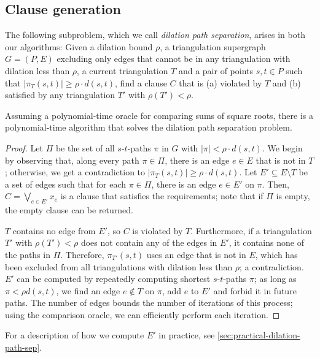 \subsection{Clause generation}
The following subproblem, which we call \emph{dilation path separation}, arises in both our algorithms:
Given a dilation bound $\rho$, a triangulation supergraph $G = (P, E)$ excluding only edges that cannot be in any triangulation with dilation less than $\rho$,
a current triangulation $T$ and a pair of points $s,t \in P$ such that $|\pi_T(s,t)| \geq \rho \cdot d(s,t)$, 
find a clause $C$ that is (a) violated by $T$ and (b) satisfied by any triangulation $T'$ with $\rho(T') < \rho$.

\begin{lemma}
    Assuming a polynomial-time oracle for comparing sums of square roots,
    there is a polynomial-time algorithm that solves the dilation path separation problem.
\end{lemma}
\begin{proof}
    Let $\Pi$ be the set of all $s$-$t$-paths $\pi$ in $G$ with $|\pi| < \rho \cdot d(s,t)$.
    We begin by observing that, along every path $\pi \in \Pi$, there is an edge $e \in E$
    that is not in $T$; otherwise, we get a contradiction to $|\pi_T(s,t)| \geq \rho \cdot d(s,t)$.
    Let $E' \subseteq E \setminus T$ be a set of edges such that for each $\pi \in \Pi$, 
    there is an edge $e \in E'$ on $\pi$.
    Then, $C = \bigvee_{e \in E'} x_e$ is a clause that satisfies the requirements;
    note that if $\Pi$ is empty, the empty clause can be returned.

    $T$ contains no edge from $E'$, so $C$ is violated by $T$.
    Furthermore, if a triangulation $T'$ with $\rho(T') < \rho$ does not contain any of the edges in $E'$,
    it contains none of the paths in $\Pi$.
    Therefore, $\pi_{T'}(s,t)$ uses an edge that is not in $E$, which has been excluded from all triangulations with dilation less than $\rho$; a contradiction.
    $E'$ can be computed by repeatedly computing shortest $s$-$t$-paths $\pi$;
    as long as $\pi < \rho d(s,t)$, we find an edge $e \notin T$ on $\pi$, add $e$ to $E'$ and forbid it in future paths.
    The number of edges bounds the number of iterations of this process;
    using the comparison oracle, we can efficiently perform each iteration.
\end{proof}

For a description of how we compute $E'$ in practice, see \cref{sec:practical-dilation-path-sep}.

